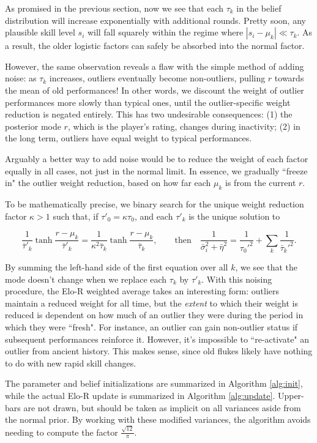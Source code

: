 \documentclass{article}
\begin{document}
As promised in the previous section, now we see that each $\tau_k$ in the belief distribution will increase exponentially with additional rounds. Pretty soon, any plausible skill level $s_i$ will fall squarely within the regime where $|s_i-\mu_k| \ll \tau_k$. As a result, the older logistic factors can safely be absorbed into the normal factor.

However, the same observation reveals a flaw with the simple method of adding noise: as $\tau_k$ increases, outliers eventually become non-outliers, pulling $r$ towards the mean of old performances! In other words, we discount the weight of outlier performances more slowly than typical ones, until the outlier-specific weight reduction is negated entirely. This has two undesirable consequences: (1) the posterior mode $r$, which is the player's rating, changes during inactivity; (2) in the long term, outliers have equal weight to typical performances.

Arguably a better way to add noise would be to reduce the weight of each factor equally in all cases, not just in the normal limit. In essence, we gradually ``freeze in" the outlier weight reduction, based on how far each $\mu_k$ is from the current $r$.

To be mathematically precise, we binary search for the unique weight reduction factor $\kappa>1$ such that, if $\tau'_0=\kappa\tau_0$, and each $\tau'_k$ is the unique solution to

\[
\frac{1}{\bar\tau'_k} \tanh \frac {r-\mu_k} {\bar\tau'_k}
= \frac{1}{\kappa^2\bar\tau_k} \tanh \frac {r-\mu_k} {\bar\tau_k},\qquad
\text{then} \quad \frac{1}{\bar\sigma_i^2 + \bar\eta^2}
= \frac{1}{\tau_0'^2} + \sum_k \frac{1}{\bar\tau_k'^2}.
\]

By summing the left-hand side of the first equation over all $k$, we see that the mode doesn't change when we replace each $\tau_k$ by $\tau'_k$. With this noising procedure, the Elo-R weighted average takes an interesting form: outliers maintain a reduced weight for all time, but the \textit{extent} to which their weight is reduced is dependent on how much of an outlier they were during the period in which they were ``fresh". For instance, an outlier can gain non-outlier status if subsequent performances reinforce it. However, it's impossible to ``re-activate" an outlier from ancient history. This makes sense, since old flukes likely have nothing to do with new rapid skill changes.

The parameter and belief initializations are summarized in Algorithm \ref{alg:init}, while the actual Elo-R update is summarized in Algorithm \ref{alg:update}. Upper-bars are not drawn, but should be taken as implicit on all variances aside from the normal prior. By working with these modified variances, the algorithm avoids needing to compute the factor $\frac{\sqrt{12}}{\pi}$.
\end{document}

